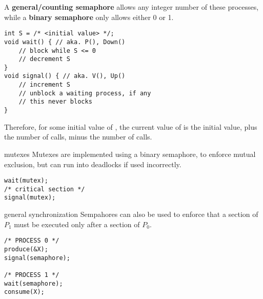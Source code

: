 A \textbf{general/counting semaphore} allows any integer number of these processes, while a \textbf{binary semaphore}
only allows either 0 or 1.

\begin{lstlisting}
int S = /* <initial value> */;
void wait() { // aka. P(), Down()
    // block while S <= 0
    // decrement S
}
void signal() { // aka. V(), Up()
    // increment S
    // unblock a waiting process, if any
    // this never blocks
}
\end{lstlisting}

Therefore, for some initial value of , the current value of  is the initial value, plus the number of  calls, minus the number of  calls.

\begin{defn}{mutexes}
    Mutexes are implemented using a binary semaphore, to enforce mutual exclusion, but can run into deadlocks if used incorrectly.
    \begin{lstlisting}
wait(mutex);
/* critical section */
signal(mutex);
    \end{lstlisting}
\end{defn}

\begin{defn}{general synchronization}
    Sempahores can also be used to enforce that a section of $P_1$ must be executed only after a section of $P_0$.

    \begin{lstlisting}
/* PROCESS 0 */
produce(&X);
signal(semaphore);

/* PROCESS 1 */
wait(semaphore);
consume(X);
    \end{lstlisting}
\end{defn}